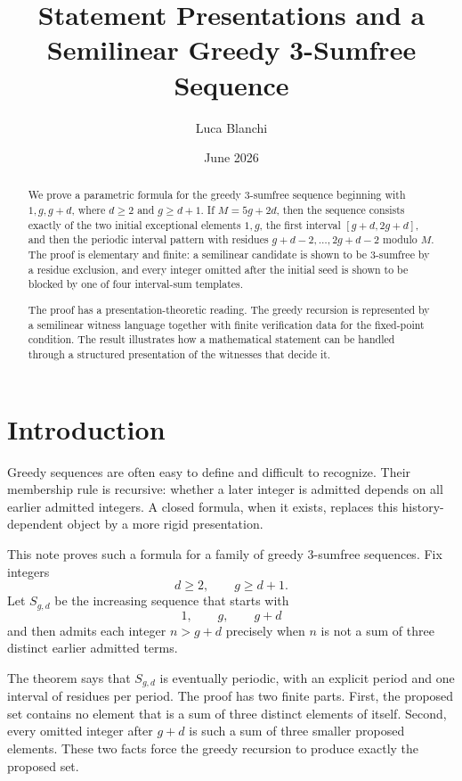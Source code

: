 \documentclass[11pt]{article}
\title{Statement Presentations and a Semilinear Greedy 3-Sumfree Sequence}
\author{Luca Blanchi}
\date{June 2026}
\begin{document}
\maketitle

\begin{abstract}
We prove a parametric formula for the greedy 3-sumfree sequence beginning with \(1,g,g+d\), where \(d\geq 2\) and \(g\geq d+1\). If \(M=5g+2d\), then the sequence consists exactly of the two initial exceptional elements \(1,g\), the first interval \([g+d,2g+d]\), and then the periodic interval pattern with residues \(g+d-2,\ldots,2g+d-2\) modulo \(M\). The proof is elementary and finite: a semilinear candidate is shown to be 3-sumfree by a residue exclusion, and every integer omitted after the initial seed is shown to be blocked by one of four interval-sum templates.

The proof has a presentation-theoretic reading. The greedy recursion is represented by a semilinear witness language together with finite verification data for the fixed-point condition. The result illustrates how a mathematical statement can be handled through a structured presentation of the witnesses that decide it.
\end{abstract}

\section{Introduction}

Greedy sequences are often easy to define and difficult to recognize. Their membership rule is recursive: whether a later integer is admitted depends on all earlier admitted integers. A closed formula, when it exists, replaces this history-dependent object by a more rigid presentation.

This note proves such a formula for a family of greedy 3-sumfree sequences. Fix integers
\[
d\geq 2,\qquad g\geq d+1.
\]
Let \(S_{g,d}\) be the increasing sequence that starts with
\[
1,\qquad g,\qquad g+d
\]
and then admits each integer \(n>g+d\) precisely when \(n\) is not a sum of three distinct earlier admitted terms.

The theorem says that \(S_{g,d}\) is eventually periodic, with an explicit period and one interval of residues per period. The proof has two finite parts. First, the proposed set contains no element that is a sum of three distinct elements of itself. Second, every omitted integer after \(g+d\) is such a sum of three smaller proposed elements. These two facts force the greedy recursion to produce exactly the proposed set.
\end{document}
